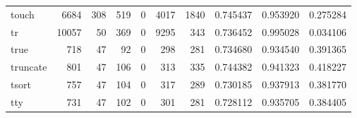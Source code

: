 \begin{tabular}{lrrrrrrrrr}
touch     &                                               6684 &                                                308 &                                                519 &                                                  0 &                                               4017 &                                               1840 &                                           0.745437 &                               0.953920 &                             0.275284 \\
tr        &                                              10057 &                                                 50 &                                                369 &                                                  0 &                                               9295 &                                                343 &                                           0.736452 &                               0.995028 &                             0.034106 \\
true      &                                                718 &                                                 47 &                                                 92 &                                                  0 &                                                298 &                                                281 &                                           0.734680 &                               0.934540 &                             0.391365 \\
truncate  &                                                801 &                                                 47 &                                                106 &                                                  0 &                                                313 &                                                335 &                                           0.744382 &                               0.941323 &                             0.418227 \\
tsort     &                                                757 &                                                 47 &                                                104 &                                                  0 &                                                317 &                                                289 &                                           0.730185 &                               0.937913 &                             0.381770 \\
tty       &                                                731 &                                                 47 &                                                102 &                                                  0 &                                                301 &                                                281 &                                           0.728112 &                               0.935705 &                             0.384405 \\

\end{tabular}
